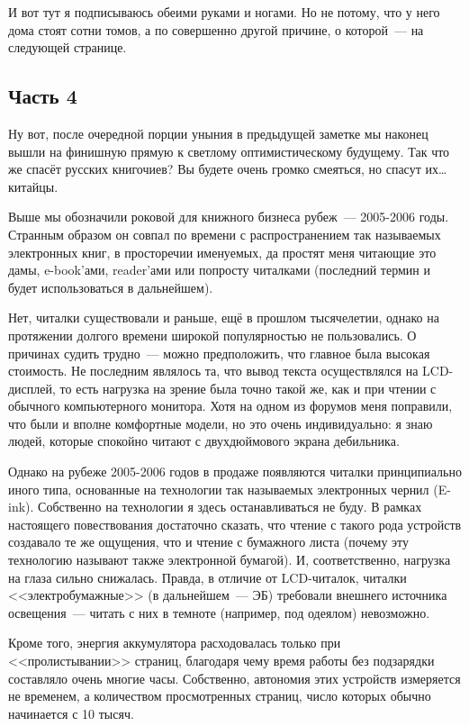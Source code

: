 И вот тут я подписываюсь обеими руками и ногами. Но не потому, что у него дома стоят сотни томов, а по совершенно другой причине, о которой~--- на следующей странице.

\subsection{Часть 4}
Ну вот, после очередной порции уныния в предыдущей заметке мы наконец вышли на финишную прямую к светлому оптимистическому будущему. Так что же спасёт русских книгочиев? Вы будете очень громко смеяться, но спасут их\dots китайцы.

Выше мы обозначили роковой для книжного бизнеса рубеж~--- 2005-2006 годы. Странным образом он совпал по времени с распространением так называемых электронных книг, в просторечии именуемых, да простят меня читающие это дамы, e-book'ами, reader'ами или попросту читалками (последний термин и будет использоваться в дальнейшем).

Нет, читалки существовали и раньше, ещё в прошлом тысячелетии, однако на протяжении долгого времени широкой популярностью не пользовались. О причинах судить трудно~--- можно предположить, что главное была высокая стоимость. Не последним являлось та, что вывод текста осуществлялся на LCD-дисплей, то есть нагрузка на зрение была точно такой же, как и при чтении с обычного компьютерного монитора. Хотя на одном из форумов меня поправили, что были и вполне комфортные модели, но это очень индивидуально: я знаю людей, которые спокойно читают с двухдюймового экрана дебильника.

Однако на рубеже 2005-2006 годов в продаже появляются читалки принципиально иного типа, основанные на технологии так называемых электронных чернил (E-ink). Собственно на технологии я здесь останавливаться не буду. В рамках настоящего повествования достаточно сказать, что чтение с такого рода устройств создавало те же ощущения, что и чтение с бумажного листа (почему эту технологию называют также электронной бумагой). И, соответственно, нагрузка на глаза сильно снижалась. Правда, в отличие от LCD-читалок, читалки <<электробумажные>> (в дальнейшем~--- ЭБ) требовали внешнего источника освещения~--- читать с них в темноте (например, под одеялом) невозможно.

Кроме того, энергия аккумулятора расходовалась только при <<пролистывании>> страниц, благодаря чему время работы без подзарядки составляло очень многие часы. Собственно, автономия этих устройств измеряется не временем, а количеством просмотренных страниц, число которых обычно начинается с 10 тысяч.

